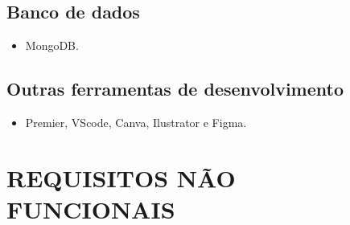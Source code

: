 \documentclass[a4paper,12pt]{article}
\begin{document}
\subsection{Banco de dados}
\begin{itemize}
    \item MongoDB.
\end{itemize}
\subsection{Outras ferramentas de desenvolvimento}
\begin{itemize}
    \item Premier, VScode, Canva, Ilustrator e Figma.
\end{itemize}

\section{REQUISITOS NÃO FUNCIONAIS}
\end{document}
